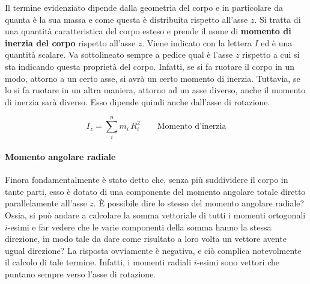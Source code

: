 Il termine evidenziato dipende dalla geometria del corpo e in particolare da quanta è la sua massa e come questa è distribuita rispetto all'asse $z$. Si tratta di una quantità caratteristica del corpo esteso e prende il nome di \textbf{momento di inerzia del corpo} rispetto all'asse $z$. Viene indicato con la lettera $I$ ed è una quantità scalare. Va sottolineato sempre a pedice qual è l'asse $z$ rispetto a cui si sta indicando questa proprietà del corpo. Infatti, se si fa ruotare il corpo in un modo, attorno a un certo asse, si avrà un certo momento di inerzia. Tuttavia, se lo si fa ruotare in un altra maniera, attorno ad un asse diverso, anche il momento di inerzia sarà diverso. Esso dipende quindi anche dall'asse di rotazione.

\[
	\boxed{I_z = \sum_i^n m_i\,R_i^2} \qquad \text{Momento d'inerzia}
\]

\paragraph{Momento angolare radiale} Finora fondamentalmente è stato detto che, senza più suddividere il corpo in tante parti, esso è dotato di una componente del momento angolare totale diretto parallelamente all'asse $z$. È possibile dire lo stesso del momento angolare radiale? Ossia, si può andare a calcolare la somma vettoriale di tutti i momenti ortogonali $i$-esimi e far vedere che le varie componenti della somma hanno la stessa direzione, in modo tale da dare come risultato a loro volta un vettore avente ugual direzione? La risposta ovviamente è negativa, e ciò complica notevolmente il calcolo di tale termine. Infatti, i momenti radiali $i$-esimi sono vettori che puntano sempre verso l'asse di rotazione.

